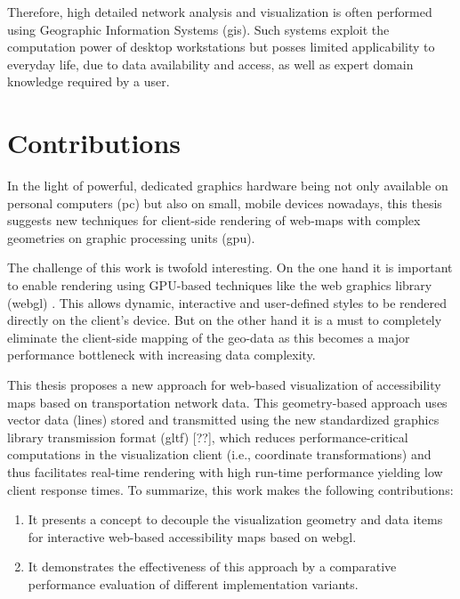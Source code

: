     Therefore, high detailed network analysis and visualization is often
    performed using Geographic Information Systems (\acrshort{gis}). Such
    systems
    exploit the computation power of desktop workstations but posses limited
    applicability to everyday life, due to data availability and access, as well
    as expert domain knowledge required by a user.\par

  \section{Contributions}
    \label{sec:intro:contr}

    In the light of powerful, dedicated graphics hardware being not only
    available on personal computers (\acrshort{pc}) but also
    on small, mobile devices nowadays, this thesis suggests new techniques for
    client-side rendering of web-maps with complex geometries on graphic
    processing units (\acrshort{gpu}).\par

    The challenge of this work is twofold interesting. On the one hand it is
    important to enable rendering using GPU-based techniques like
    the web graphics library (\acrshort{webgl}) \cite{Jackson2016}.
    This allows dynamic, interactive and user-defined styles to be rendered
    directly on the client's device. But on the other hand it is a must to
    completely eliminate the client-side mapping of the geo-data as this becomes
    a major performance bottleneck with increasing data complexity.\par

    This thesis proposes a new approach for web-based visualization of
    accessibility maps based on transportation network data. This geometry-based
    approach uses vector data (lines) stored and transmitted using the new
    standardized graphics library transmission format (\acrshort{gltf}) [??],
    which reduces performance-critical
    computations in the visualization client (i.e., coordinate transformations)
    and thus facilitates real-time rendering with high run-time performance
    yielding low client response times. To summarize, this work makes the
    following contributions:\par

    \begin{enumerate}[\label=({C}1)]
      \item It presents a concept to decouple the visualization geometry and
        data items for interactive web-based accessibility maps based on
        \acrshort{webgl}. %
      \item It demonstrates the effectiveness of this approach by a
        comparative performance evaluation of different implementation
        variants.
    \end{enumerate}

